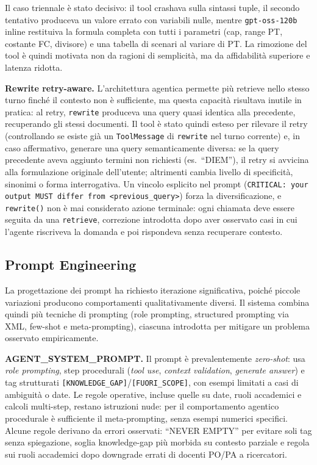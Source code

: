 \documentclass[11pt,a4paper]{article}
\newcommand{\code}[1]{\texttt{\small#1}}
\begin{document}
Il caso triennale è stato decisivo: il tool crashava sulla sintassi tuple, il secondo
tentativo produceva un valore errato con variabili nulle, mentre \code{gpt-oss-120b}
inline restituiva la formula completa con tutti i parametri (cap, range PT, costante FC,
divisore) e una tabella di scenari al variare di PT. La rimozione del tool è quindi
motivata non da ragioni di semplicità, ma da affidabilità superiore e latenza ridotta.

\textbf{Rewrite retry-aware.} L'architettura agentica permette più retrieve nello stesso
turno finché il contesto non è sufficiente, ma questa capacità risultava inutile in
pratica: al retry, \code{rewrite} produceva una query quasi identica alla precedente,
recuperando gli stessi documenti. Il tool è stato quindi esteso per rilevare il retry
(controllando se esiste già un \code{ToolMessage} di \code{rewrite} nel turno corrente) e,
in caso affermativo, generare una query semanticamente diversa: se la query precedente
aveva aggiunto termini non richiesti (es.\ ``DIEM''), il retry si avvicina alla
formulazione originale dell'utente; altrimenti cambia livello di specificità, sinonimi o
forma interrogativa. Un vincolo esplicito nel prompt (\texttt{CRITICAL: your output MUST
differ from <previous\_query>}) forza la diversificazione, e \code{rewrite()} non è mai
considerato azione terminale: ogni chiamata deve essere seguita da una \code{retrieve},
correzione introdotta dopo aver osservato casi in cui l'agente riscriveva la domanda e poi
rispondeva senza recuperare contesto.

\subsection{Prompt Engineering}
\label{sec:prompts}

La progettazione dei prompt ha richiesto iterazione significativa, poiché piccole
variazioni producono comportamenti qualitativamente diversi.
Il sistema combina quindi più tecniche di prompting (role prompting, structured prompting
via XML, few-shot e meta-prompting), ciascuna introdotta per mitigare un problema
osservato empiricamente.

\textbf{AGENT\_SYSTEM\_PROMPT.} Il prompt è prevalentemente \emph{zero-shot}: usa
\emph{role prompting}, step procedurali (\emph{tool use}, \emph{context validation},
\emph{generate answer}) e tag strutturati \texttt{[KNOWLEDGE\_GAP]}/\texttt{[FUORI\_SCOPE]},
con esempi limitati a casi di ambiguità o date. Le regole operative, incluse quelle su
date, ruoli accademici e calcoli multi-step, restano istruzioni nude: per il comportamento
agentico procedurale è sufficiente il meta-prompting, senza esempi numerici specifici.
Alcune regole derivano da errori osservati: ``NEVER EMPTY'' per evitare soli tag senza
spiegazione, soglia knowledge-gap più morbida su contesto parziale e regola sui ruoli
accademici dopo downgrade errati di docenti PO/PA a ricercatori.
\end{document}
